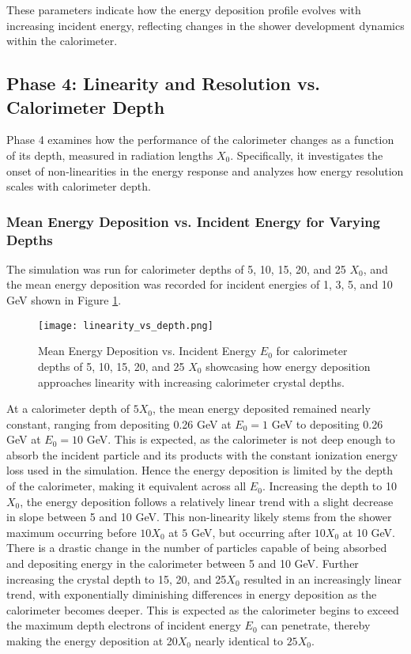 \documentclass[twocolumn]{aastex631}
\begin{document}
These parameters indicate how the energy deposition profile evolves with
increasing incident energy, reflecting changes in the shower development
dynamics within the calorimeter. 

\subsection{Phase 4: Linearity and Resolution vs. Calorimeter Depth} 

Phase 4 examines how the performance of the calorimeter changes as a function of
its depth, measured in radiation lengths $X_0$. Specifically, it
investigates the onset of non-linearities in the energy response and analyzes
how energy resolution scales with calorimeter depth.

\subsubsection{Mean Energy Deposition vs. Incident Energy for Varying Depths} 

The simulation was run for calorimeter depths of 5, 10, 15, 20, and 25 $X_0$,
and the mean energy deposition was recorded for incident energies of 1, 3, 5,
and 10 GeV shown in Figure \ref{fig:e_1}. 
 
\begin{figure}[htp]
  \centering
    \texttt{[image: linearity\_vs\_depth.png]}
    \caption{Mean Energy Deposition vs. Incident Energy $E_0$ for calorimeter
        depths of 5, 10, 15, 20, and 25 $X_0$ showcasing how energy deposition
    approaches linearity with increasing calorimeter crystal depths.}
    \label{fig:e_1}
\end{figure}


At a calorimeter depth of $5X_0$, the mean energy deposited remained nearly constant,
ranging from depositing 0.26 GeV at $E_0 = 1$ GeV to depositing 0.26 GeV at $E_0
= 10$ GeV. This is expected, as the calorimeter is not deep enough to absorb
the incident particle and its products with the constant ionization energy loss
used in the simulation. Hence the energy deposition is limited by the depth of
the calorimeter, making it equivalent across all $E_0$. Increasing the depth to
10$X_0$, the energy deposition follows a relatively linear trend with a slight
decrease in slope between 5 and 10 GeV. This non-linearity likely
stems from the shower maximum occurring before $10X_0$ at $5$ GeV, but occurring
after  $10X_0$ at 10 GeV. There is a drastic change in the number of particles
capable of being absorbed and depositing energy in the calorimeter between 5 and
10 GeV. Further increasing the crystal depth to 15, 20, and 25$X_0$ resulted in an
increasingly linear trend, with exponentially diminishing differences in energy deposition as
the calorimeter becomes deeper. This is expected as the calorimeter begins to
exceed the maximum depth electrons of incident energy $E_0$ can penetrate, thereby
making the energy deposition at 20$X_0$ nearly identical to $25X_0$.
\end{document}
